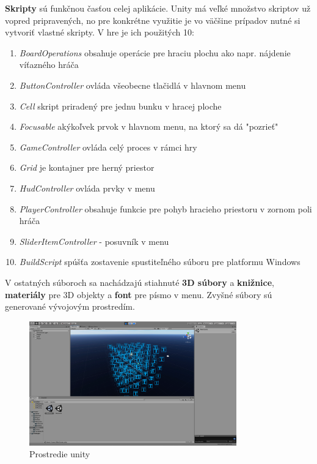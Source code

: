 \textbf{Skripty} sú funkčnou časťou celej aplikácie.
Unity má veľké množstvo skriptov už vopred pripravených, no pre konkrétne využitie je vo väčšine prípadov nutné si
vytvoriť vlastné skripty.
V hre je ich použitých 10:
\begin{enumerate}
    \item \emph{BoardOperations} obsahuje operácie pre hraciu plochu ako napr. nájdenie víťazného hráča
    \item \emph{ButtonController} ovláda všeobecne tlačidlá v hlavnom menu
    \item \emph{Cell} skript priradený pre jednu bunku v hracej ploche
    \item \emph{Focusable} akýkoľvek prvok v hlavnom menu, na ktorý sa dá "pozrieť"
    \item \emph{GameController} ovláda celý proces v rámci hry
    \item \emph{Grid} je kontajner pre herný priestor
    \item \emph{HudController} ovláda prvky v menu
    \item \emph{PlayerController} obsahuje funkcie pre pohyb hracieho priestoru v zornom poli hráča
    \item \emph{SliderItemController} - posuvník v menu
    \item \emph{BuildScript} spúšťa zostavenie spustiteľného súboru pre platformu Windows
\end{enumerate}

V ostatných súboroch sa nachádzajú stiahnuté \textbf{3D súbory} a \textbf{knižnice}, \textbf{materiály} pre 3D objekty
a \textbf{font} pre písmo v menu.
Zvyšné súbory sú generované vývojovým prostredím.

\begin{figure}[H]
    \centering
    \includegraphics[width=0.8\textwidth]{images/unity.png}
    \caption{Prostredie unity}
\end{figure}\label{figure:unity}


